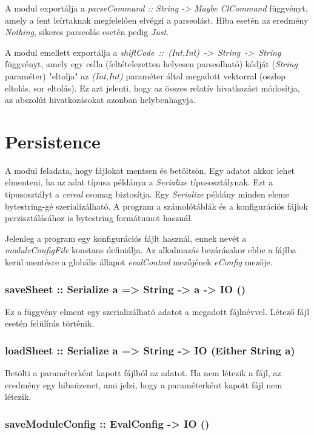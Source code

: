 A modul exportálja a \textit{parseCommand :: String -> Maybe ClCommand} függvényt, amely a fent leírtaknak megfelelően elvégzi a parseolást. Hiba esetén az eredmény \textit{Nothing}, sikeres parseolás esetén pedig \textit{Just}.

A modul emellett exportálja a \mbox{\textit{shiftCode :: (Int,Int) -> String -> String}} függvényt, amely egy cella (feltételezetten helyesen parseolható) kódját (\textit{String} paraméter) "eltolja" az \textit{(Int,Int)} paraméter által megadott vektorral (oszlop eltolás, sor eltolás). Ez azt jelenti, hogy az összes relatív hivatkozást módosítja, az abszolút hivatkozásokat azonban helybenhagyja.

\section{Persistence}

A modul feladata, hogy fájlokat mentsen és betöltsön. Egy adatot akkor lehet elmenteni, ha az adat típusa példánya a \textit{Serialize} típusosztálynak. Ezt a típusosztályt a \textit{cereal} csomag biztosítja. Egy \textit{Serialize} példány minden eleme bytestring-gé szerializálható. A program a számolótáblák és a konfigurációs fájlok perzisztálásához is bytestring formátumot használ.

Jelenleg a program egy konfigurációs fájlt használ, ennek nevét a \textit{moduleConfigFile} konstans definiálja. Az alkalmazás bezárásakor ebbe a fájlba kerül mentésre a globális állapot \textit{evalControl} mezőjének \textit{eConfig} mezője.

\subsubsection{saveSheet :: Serialize a => String -> a -> IO ()}

Ez a függvény elment egy szerializálható adatot a megadott fájlnévvel. Létező fájl esetén felülírás történik. 

\subsubsection{loadSheet :: Serialize a => String -> IO (Either String a)}

Betölti a paraméterként kapott fájlból az adatot. Ha nem létezik a fájl, az eredmény egy hibaüzenet, ami jelzi, hogy a paraméterként kapott fájl nem létezik.

\subsubsection{saveModuleConfig :: EvalConfig -> IO ()}

